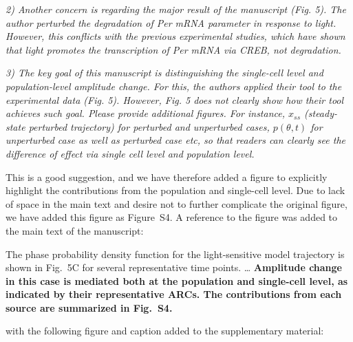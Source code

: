 \documentclass[11pt, letterpaper]{article}
\newenvironment{reviewer}{\itshape\color{gray}}{}
\newenvironment{manuscript}[1]{\begin{center}\begin{tcolorbox}[colback=green!5!white,colframe=green!75!black,width=0.8\textwidth,title={#1},breakable,fonttitle=\bfseries]}{\end{tcolorbox}\end{center}}
\begin{document}
\begin{reviewer}
2) Another concern is regarding the major result of the manuscript (Fig. 5). The author perturbed the degradation of Per mRNA parameter in response to light. However, this conflicts with the previous experimental studies, which have shown that light promotes the transcription of Per mRNA via CREB, not degradation. 
\end{reviewer}

\begin{reviewer}
3) The key goal of this manuscript is distinguishing the single-cell level and population-level amplitude change. For this, the authors applied their tool to the experimental data (Fig. 5). However, Fig. 5 does not clearly show how their tool achieves such goal. Please provide additional figures. For instance, $x_{ss}$ (steady-state perturbed trajectory) for perturbed and unperturbed cases, $p(\theta, t)$ for unperturbed case as well as perturbed case etc, so that readers can clearly see the difference of effect via single cell level and population level.  
\end{reviewer}

This is a good suggestion, and we have therefore added a figure to explicitly highlight the contributions from the population and single-cell level.
Due to lack of space in the main text and desire not to further complicate the original figure, we have added this figure as Figure~S4. A reference to the figure was added to the main text of the manuscript:

\begin{manuscript}{Page 16}
The phase probability density function for the light-sensitive model trajectory is shown in Fig.~5C for several representative time points.
\ldots
{\bfseries Amplitude change in this case is mediated both at the population and single-cell level, as indicated by their representative ARCs. The contributions from each source are summarized in Fig.~S4.}
\end{manuscript}

with the following figure and caption added to the supplementary material:
\end{document}
